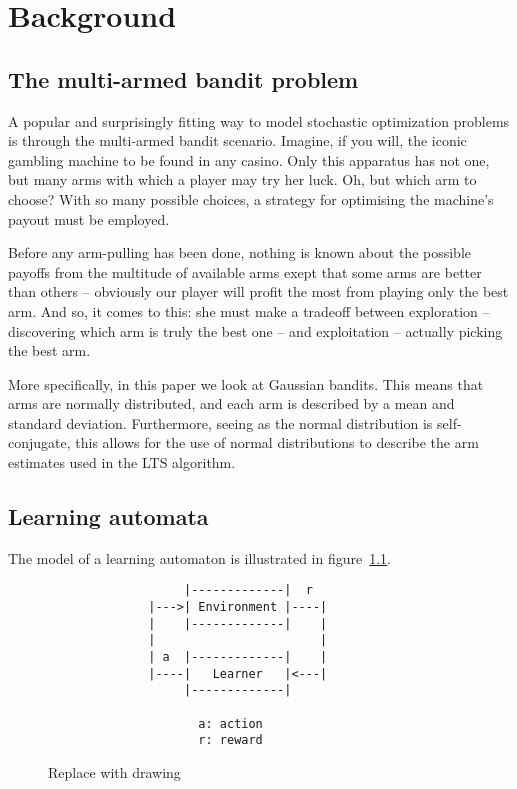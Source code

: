 \chapter{Background}
\label{ch:background}

\section{The multi-armed bandit problem}
A popular and surprisingly fitting way to model stochastic optimization problems 
is through the multi-armed bandit scenario. Imagine, if you will, the iconic 
gambling machine to be found in any casino. Only this apparatus has not one, but 
many arms with which a player may try her luck. Oh, but which arm to choose? 
With so many possible choices, a strategy for optimising the machine’s payout 
must be employed. 

Before any arm-pulling has been done, nothing is known about the possible 
payoffs from the multitude of available arms exept that some arms are better 
than others -- obviously our player will profit the most from playing only the 
best arm. And so, it comes to this: she must make a tradeoff between exploration 
-- discovering which arm is truly the best one -- and exploitation -- actually 
picking the best arm.

More specifically, in this paper we look at Gaussian bandits.
This means that arms are normally distributed, and each arm is described by a mean and standard deviation.
Furthermore, seeing as the normal distribution is self-conjugate, this allows for the use of normal distributions to describe the arm estimates used in the LTS algorithm.





\section{Learning automata}
The model of a learning automaton is illustrated in figure~\ref{fig:la}.
\begin{figure}[ht]
        \begin{verbatim}
                   |-------------|  r
              |--->| Environment |----|
              |    |-------------|    |
              |                       | 
              | a  |-------------|    |
              |----|   Learner   |<---|
                   |-------------|
         
                     a: action
                     r: reward
        \end{verbatim}
        \label{fig:la}
    \caption{Replace with drawing}
\end{figure}

